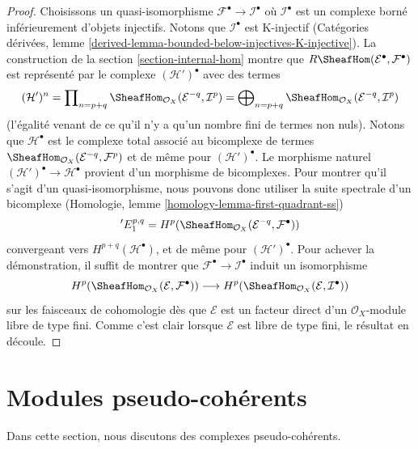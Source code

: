 {\begin{proof}

Choisissons un quasi-isomorphisme $\mathcal{F}^\bullet \to \mathcal{I}^\bullet$
où $\mathcal{I}^\bullet$ est un complexe borné inférieurement d'objets injectifs. Notons que $\mathcal{I}^\bullet$ est K-injectif (Catégories dérivées, lemme
\ref{derived-lemma-bounded-below-injectives-K-injective}). La construction de la section \ref{section-internal-hom}
montre que
$R\SheafHom(\mathcal{E}^\bullet, \mathcal{F}^\bullet)$ est représenté par le complexe $(\mathcal{H}')^\bullet$ avec des termes
$$
(\mathcal{H}')^n =
\prod\nolimits_{n = p + q}
\SheafHom_{\mathcal{O}_X}(\mathcal{E}^{-q}, \mathcal{I}^p) =
\bigoplus\nolimits_{n = p + q}
\SheafHom_{\mathcal{O}_X}(\mathcal{E}^{-q}, \mathcal{I}^p)
$$
(l'égalité venant de ce qu'il n'y a qu'un nombre fini de termes non nuls). Notons que $\mathcal{H}^\bullet$ est le complexe total associé au bicomplexe de termes
$\SheafHom_{\mathcal{O}_X}(\mathcal{E}^{-q}, \mathcal{F}^p)$
et de même pour $(\mathcal{H}')^\bullet$. Le morphisme naturel $(\mathcal{H}')^\bullet \to \mathcal{H}^\bullet$ provient d'un morphisme de bicomplexes.
Pour montrer qu'il s'agit d'un quasi-isomorphisme, nous pouvons donc utiliser la suite spectrale d'un bicomplexe (Homologie, lemme \ref{homology-lemma-first-quadrant-ss})
$$
{}'E_1^{p, q} =
H^p(\SheafHom_{\mathcal{O}_X}(\mathcal{E}^{-q}, \mathcal{F}^\bullet))
$$
convergeant vers $H^{p + q}(\mathcal{H}^\bullet)$, et de même pour
$(\mathcal{H}')^\bullet$. Pour achever la démonstration, il suffit de montrer que $\mathcal{F}^\bullet \to \mathcal{I}^\bullet$
induit un isomorphisme
$$
H^p(\SheafHom_{\mathcal{O}_X}(\mathcal{E}, \mathcal{F}^\bullet))
\longrightarrow
H^p(\SheafHom_{\mathcal{O}_X}(\mathcal{E}, \mathcal{I}^\bullet))
$$
sur les faisceaux de cohomologie dès que $\mathcal{E}$ est un facteur direct d'un $\mathcal{O}_X$-module libre de type fini. Comme c'est clair lorsque $\mathcal{E}$
est libre de type fini, le résultat en découle.

\end{proof}





\section{Modules pseudo-cohérents}

\label{section-pseudo-coherent}

\noindent
Dans cette section, nous discutons des complexes pseudo-cohérents.

}
